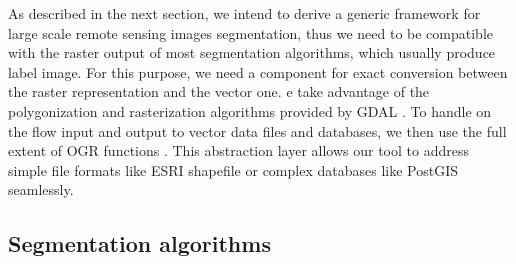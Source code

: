 \documentclass{josis}
\begin{document}
As described in the next section, we intend to derive a generic
framework for large scale remote sensing images segmentation, thus we
need to be compatible with the raster output of most segmentation
algorithms, which usually produce label image. For this purpose, we
need a component for exact conversion between the raster
representation and the vector one. e take advantage of the
polygonization and rasterization algorithms provided by GDAL
\cite{}. To handle on the flow input and output to vector data files
and databases, we then use the full extent of OGR functions
\cite{}. This abstraction layer allows our tool to address
simple file formats like ESRI shapefile or complex databases like
PostGIS seamlessly.

\subsection{Segmentation algorithms}
\end{document}
